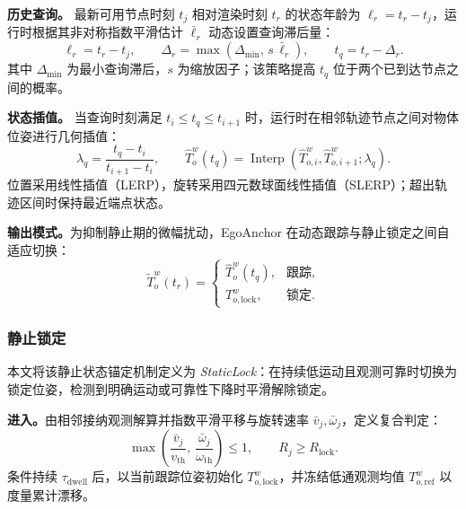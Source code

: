 \documentclass[review]{vgtc}
\begin{document}
\textbf{历史查询。}
最新可用节点时刻 $t_j$ 相对渲染时刻 $t_r$ 的状态年龄为 $\ell_r=t_r-t_j$，运行时根据其非对称指数平滑估计 $\bar{\ell}_r$ 动态设置查询滞后量：
\begin{equation}
\ell_r = t_r - t_j, \qquad \Delta_r = \max(\Delta_{\min},\, s\,\bar{\ell}_r), \qquad t_q = t_r - \Delta_r.
\label{eq:target-time}
\end{equation}
其中 $\Delta_{\min}$ 为最小查询滞后，$s$ 为缩放因子；该策略提高 $t_q$ 位于两个已到达节点之间的概率。

\textbf{状态插值。}
当查询时刻满足 $t_i\leq t_q\leq t_{i+1}$ 时，运行时在相邻轨迹节点之间对物体位姿进行几何插值：
\begin{equation}
\lambda_q = \frac{t_q - t_i}{t_{i+1} - t_i}, \qquad
\widehat{T}_o^w(t_q) = \operatorname{Interp}(\widehat{T}_{o,i}^{w}, \widehat{T}_{o,i+1}^{w}; \lambda_q).
\label{eq:history-interp}
\end{equation}
位置采用线性插值（LERP），旋转采用四元数球面线性插值（SLERP）；超出轨迹区间时保持最近端点状态。

\textbf{输出模式。}为抑制静止期的微幅扰动，EgoAnchor 在动态跟踪与静止锁定之间自适应切换：
\begin{equation}
\widetilde{T}_o^w(t_r) = \begin{cases}
\widehat{T}_o^w(t_q), & \text{跟踪}, \\
T_{o,\mathrm{lock}}^w, & \text{锁定}.
\end{cases}
\label{eq:staticlock}
\end{equation}

\subsubsection{静止锁定}\label{sec:staticlock}

本文将该静止状态锚定机制定义为 \emph{StaticLock}：在持续低运动且观测可靠时切换为锁定位姿，检测到明确运动或可靠性下降时平滑解除锁定。

\textbf{进入。}由相邻接纳观测解算并指数平滑平移与旋转速率 $\bar v_j,\bar\omega_j$，定义复合判定：
\begin{equation}
\max\left(\frac{\bar{v}_j}{v_{\mathrm{th}}},\ \frac{\bar{\omega}_j}{\omega_{\mathrm{th}}}\right) \leq 1, \qquad R_j \geq R_{\mathrm{lock}}.
\label{eq:lock-entry}
\end{equation}
条件持续 $\tau_{\mathrm{dwell}}$ 后，以当前跟踪位姿初始化 $T_{o,\mathrm{lock}}^w$，并冻结低通观测均值 $T_{o,\mathrm{ref}}^w$ 以度量累计漂移。
\end{document}
